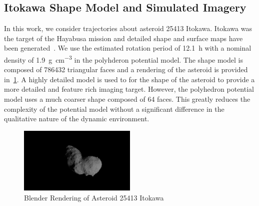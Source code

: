 \documentclass[letterpaper, paper,11pt]{AAS}		%
\begin{document}
\subsection{Itokawa Shape Model and Simulated Imagery}\label{sec:imagery}
In this work, we consider trajectories about asteroid 25413 Itokawa.
Itokawa was the target of the Hayabusa mission and detailed shape and surface maps have been generated~\cite{kawaguchi2006,tanimoto2013,fujiwara2006}.
We use the estimated rotation period of \SI{12.1}{\hour} with a nominal density of \SI{1.9}{\gram\per\centi\meter\cubed} in the polyhderon potential model.
The shape model is composed of \num{786432} triangular faces and a rendering of the asteroid is provided in~\cref{fig:itokawa_3d}.
A highly detailed model is used to for the shape of the asteroid to provide a more detailed and feature rich imaging target. 
However, the polyhedron potential model uses a much coarser shape composed of \num{64} faces. 
This greatly reduces the complexity of the potential model without a significant difference in the qualitative nature of the dynamic environment.
\begin{figure}[htbp]
    \centering
    \includegraphics[width=0.5\textwidth, keepaspectratio]{figures/itokawa_blender.png}
    \caption{Blender Rendering of Asteroid 25413 Itokawa}
    \label{fig:itokawa_3d}
\end{figure}
\end{document}
